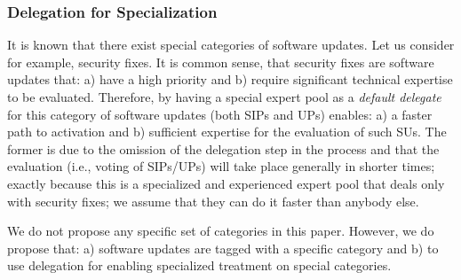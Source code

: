 \subsubsection{Delegation for Specialization} \label{appxdelspecial}
It is known that there exist special categories of software updates. Let us
consider for example, security fixes. It is common sense, that security fixes
are software updates that: a) have a high priority and b) require significant
technical expertise to be evaluated. Therefore, by having a special expert pool
as a \emph{default delegate} for this category of software updates (both SIPs
and UPs) enables: a) a faster path to activation and b) sufficient expertise for
the evaluation of such SUs. The former is due to the omission of the delegation
step in the process and that the evaluation (i.e., voting of SIPs/UPs) will take
place generally in shorter times; exactly because this is a specialized and
experienced expert pool that deals only with security fixes; we assume that they
can do it faster than anybody else.


We do not propose any specific set of categories in this paper. However, we do
propose that: a) software updates are tagged with a specific category and b) to
use delegation for enabling specialized treatment on special categories.

